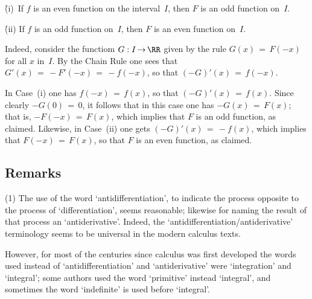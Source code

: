 \VA

        \h (i)\, If $f$ is an even function on the interval~$I$, then $F$ is an odd function on~$I$.

        \h (ii) If $f$ is an odd function on~$I$, then $F$ is an even function on~$I$.

\VA

\noindent Indeed, consider the functiom $G:I \,{\rightarrow}\, {\RR}$ given by the rule $G(x) \,=\, F(-x)$ for all $x$ in~$I$.
    By the Chain Rule one sees that $G'(x) \,=\, -F'(-x) \,=\, -f(-x)$, so that $(-G)'(x) \,=\, f(-x)$.

        In Case~(i) one has $f(-x) \,=\, f(x)$, so that $(-G)'(x) \,=\, f(x)$. Since clearly $-G(0) \,=\, 0$,
    it follows that in this case one has $-G(x) \,=\, F(x)$; that is, $-F(-x) \,=\, F(x)$, which implies that $F$ is an odd function, as claimed.
    Likewise, in Case~(ii) one gets $(-G)'(x) \,=\, -f(x)$, which implies that $F(-x) \,=\, F(x)$, so that $F$ is an even function, as claimed.

\VV

             \subsection{\small{\bf Remarks}}
            \label{RemrkE45.70}
\V

\hspace*{\parindent}(1) The use of the word `antidifferentiation', to indicate the process opposite to the process of `differentiation', seems reasonable;
    likewise for naming the result of that process an `antiderivative'. Indeed, the `antidifferentiation/antiderivative' terminology
    seems to be universal in the modern calculus texts.

    However, for most of the centuries since calculus was first developed the words used instead of `antidifferentiation' and `antiderivative' were 
    `integration' and `integral'; some authors used the word `primitive' instead `integral', and sometimes the word `indefinite' is used before `integral'.

